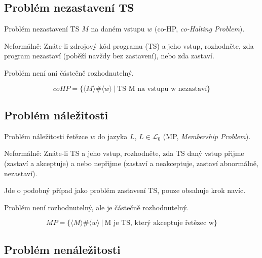 \subsection*{Problém nezastavení TS}

\begin{compactitem}
    \item Problém nezastavení TS $M$ na daném vstupu $w$ (co-HP, \textit{co-Halting Problem}).

    \item Neformálně: Znáte-li zdrojový kód programu (TS) a jeho vstup, rozhodněte, zda program nezastaví (poběží navždy bez zastavení), nebo zda zastaví.

    \item Problém není ani částečně rozhodnutelný.
\end{compactitem}

$$ coHP = \{ \langle M \rangle \# \langle w \rangle ~|~ \text{TS M na vstupu w nezastaví} \} $$

\subsection*{Problém náležitosti}

\begin{compactitem}
    \item Problém náležitosti řetězce $w$ do jazyka $L$, $L \in \mathcal{L}_0$ (MP, \textit{Membership Problem}).

    \item Neformálně: Znáte-li TS a jeho vstup, rozhodněte, zda TS daný vstup přijme (zastaví a akceptuje) a nebo nepřijme (zastaví a neakceptuje, zastaví abnormálně, nezastaví). \begin{compactitem}
        \item Jde o podobný případ jako problém zastavení TS, pouze obsahuje krok navíc.
    \end{compactitem}

    \item Problém není rozhodnutelný, ale je částečně rozhodnutelný.
\end{compactitem}

$$ MP = \{ \langle M \rangle \# \langle w \rangle ~|~ \text{M je TS, který akceptuje řetězec w} \} $$

\subsection*{Problém nenáležitosti}

